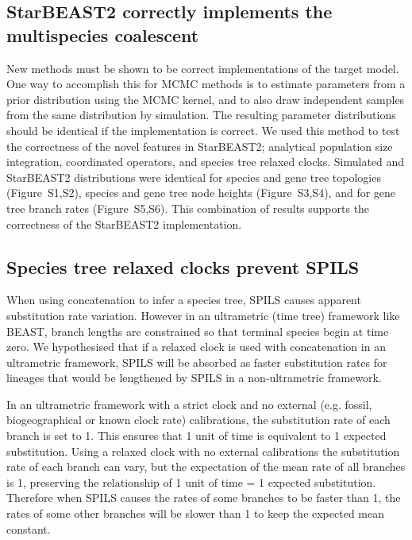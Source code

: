 \documentclass[12pt]{article}
\begin{document}
\subsection{StarBEAST2 correctly implements the multispecies coalescent}

New methods must be shown to be correct implementations of the target model.
One way to accomplish this for MCMC methods is to estimate parameters from a
prior distribution using the MCMC kernel, and to also draw independent samples
from the same distribution by simulation. The resulting parameter
distributions should be identical if the implementation is correct. We used
this method to test the correctness of the novel features in StarBEAST2;
analytical population size integration, coordinated operators, and species
tree relaxed clocks. Simulated and StarBEAST2 distributions were identical for
species and gene tree topologies (Figure~S1,S2), species and gene tree node
heights (Figure~S3,S4), and for gene tree branch rates (Figure~S5,S6). This
combination of results supports the correctness of the StarBEAST2
implementation.

\subsection{Species tree relaxed clocks prevent SPILS}

When using concatenation to infer a species tree, SPILS causes apparent
substitution rate variation. However
in an ultrametric (time tree) framework like BEAST, branch lengths are
constrained so that terminal species begin at time zero. We hypothesised that
if a relaxed clock is used with concatenation in an ultrametric framework,
SPILS will be absorbed as faster substitution rates for lineages that would be
lengthened by SPILS in a non-ultrametric framework.

In an ultrametric framework with a strict clock and no external (e.g. fossil,
biogeographical or known clock rate) calibrations, the substitution rate of
each branch is set to 1. This ensures that 1 unit of time is equivalent to 1
expected substitution. Using a relaxed clock with no external calibrations the
substitution rate of each branch can vary, but the expectation of the mean
rate of all branches is 1, preserving the relationship of 1 unit of time = 1
expected substitution. Therefore when SPILS causes the rates of some branches
to be faster than 1, the rates of some other branches will be slower than 1 to
keep the expected mean constant.
\end{document}
